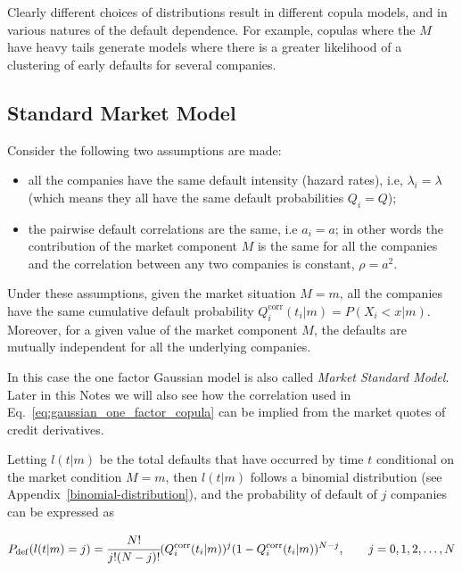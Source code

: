 Clearly different choices of distributions result in different copula models, and in various natures of the default dependence. For example, copulas where the \(M\) have heavy tails generate models where there is a greater likelihood of a clustering of early defaults for several companies.

\subsection{Standard Market Model}\label{standard-market-model}

Consider the following two assumptions are made:

\begin{itemize}
	\tightlist
	\item
	all the companies have the same default intensity (hazard rates), i.e, \(\lambda_i = \lambda\) (which means they all have the same default probabilities $Q_i = Q$);
	\item
	the pairwise default correlations are the same, i.e \(a_i = a\); in other words the contribution of the market
	component $M$ is the same for all the companies and the correlation between any two companies is constant, \(\rho = a^2\).
\end{itemize}

Under these assumptions, given the market situation \(M = m\), all the companies have the same cumulative default probability \(Q_i^{\textrm{corr}}(t_i|m)=P(X_i < x|m)\). Moreover, for a given value of the market component \(M\), the defaults are mutually independent for all the underlying companies. 

In this case the one factor Gaussian model is also called \emph{Market Standard Model}. Later in this Notes we will also see how the correlation used in Eq.~\ref{eq:gaussian_one_factor_copula} can be implied from the market quotes of credit derivatives.

Letting \(l(t|m)\) be the total defaults that have occurred by time \(t\) conditional on the market condition \(M = m\), then \(l(t|m)\) follows a binomial distribution (see Appendix~\ref{binomial-distribution}), and the probability of default of $j$ companies can be expressed as

\begin{equation}
P_{\mathrm{def}}(l(t|m) = j) = \cfrac{N!}{j!(N-j)!}(Q_i^{\textrm{corr}}(t_i|m))^j(1-Q_i^{\textrm{corr}}(t_i|m))^{N-j},\qquad  j=0, 1, 2,\ldots,N
\end{equation}

